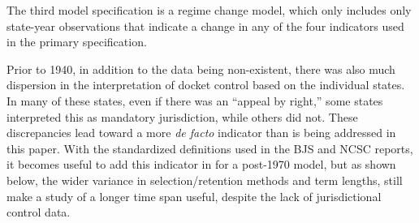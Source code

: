 \documentclass[12pt]{article}
\begin{document}
The third model specification is a regime change model, which only includes only state-year observations that indicate a change in any of the four indicators used in the primary specification.  

Prior to 1940, in addition to the data being non-existent, there was also much dispersion in the interpretation of docket control based on the individual states.  In many of these states, even if there was an ``appeal by right,'' some states interpreted this as mandatory jurisdiction, while others did not.  These discrepancies lead toward a more \textit{de facto} indicator than is being addressed in this paper.  With the standardized definitions used in the BJS and NCSC reports, it becomes useful to add this indicator in for a post-1970 model, but as shown below, the wider variance in selection/retention methods and term lengths, still make a study of a longer time span useful, despite the lack of jurisdictional control data.  
\end{document}
